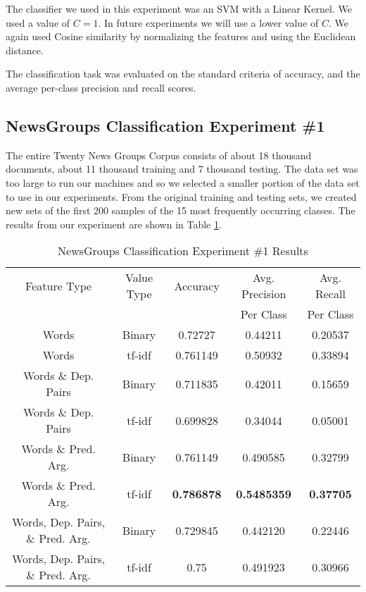 \documentclass[11pt]{article}
\newcommand{\headcol}{\rowcolor{tableheadcolor}} %
\begin{document}
The classifier we used in this experiment was an SVM with a Linear Kernel. We used a value of $C=1$. In future experiments we will use a lower value of $C$. We again used Cosine similarity by normalizing the features and using the Euclidean distance.  

The classification task was evaluated on the standard criteria of accuracy, and the average per-class precision and recall scores.

\subsection{NewsGroups Classification Experiment \#1}

The entire Twenty News Groups Corpus consists of about 18 thousand documents, about 11 thousand training and 7 thousand testing. The data set was too large to run our machines and so we selected a smaller portion of the data set to use in our experiments. From the original training and testing sets, we created new sets of the first 200 samples of the 15 most frequently occurring classes. The results from our experiment are shown in Table \ref{tbl:NewsGroupsClassification1}.

\begin{table}[H]
\centering
\caption{NewsGroups Classification Experiment \#1 Results}
\label{tbl:NewsGroupsClassification1}
\begin{tabular}{|c|c|c|c|c|}
\hline
\headcol \color{white} Feature Type & \color{white} Value Type & \color{white} Accuracy & \color{white} Avg. Precision  & \color{white} Avg. Recall \\
 \headcol & & &  \color{white} Per Class & \color{white}  Per Class \\
\hline
Words & Binary & 0.72727 & 0.44211 &  0.20537  \\
Words & tf-idf &  0.761149  & 0.50932 & 0.33894\\
Words \& Dep. Pairs & Binary & 0.711835 & 0.42011 & 0.15659 \\
Words \& Dep. Pairs & tf-idf & 0.699828 & 0.34044 & 0.05001 \\
Words \& Pred. Arg. & Binary & 0.761149 & 0.490585 & 0.32799 \\
Words \& Pred. Arg.  & tf-idf & \textbf{0.786878} & \textbf{0.5485359} & \textbf{0.37705} \\
Words, Dep. Pairs, \& Pred. Arg. & Binary & 0.729845 & 0.442120 & 0.22446 \\
Words, Dep. Pairs, \& Pred. Arg.& tf-idf & 0.75 & 0.491923 & 0.30966 \\
\hline
\end{tabular}
\end{table}
\end{document}
